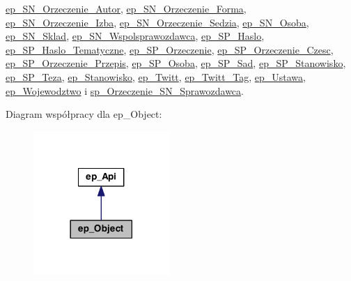 \hyperlink{classep___s_n___orzeczenie___autor}{ep\-\_\-\-S\-N\-\_\-\-Orzeczenie\-\_\-\-Autor}, \hyperlink{classep___s_n___orzeczenie___forma}{ep\-\_\-\-S\-N\-\_\-\-Orzeczenie\-\_\-\-Forma}, \hyperlink{classep___s_n___orzeczenie___izba}{ep\-\_\-\-S\-N\-\_\-\-Orzeczenie\-\_\-\-Izba}, \hyperlink{classep___s_n___orzeczenie___sedzia}{ep\-\_\-\-S\-N\-\_\-\-Orzeczenie\-\_\-\-Sedzia}, \hyperlink{classep___s_n___osoba}{ep\-\_\-\-S\-N\-\_\-\-Osoba}, \hyperlink{classep___s_n___sklad}{ep\-\_\-\-S\-N\-\_\-\-Sklad}, \hyperlink{classep___s_n___wspolsprawozdawca}{ep\-\_\-\-S\-N\-\_\-\-Wspolsprawozdawca}, \hyperlink{classep___s_p___haslo}{ep\-\_\-\-S\-P\-\_\-\-Haslo}, \hyperlink{classep___s_p___haslo___tematyczne}{ep\-\_\-\-S\-P\-\_\-\-Haslo\-\_\-\-Tematyczne}, \hyperlink{classep___s_p___orzeczenie}{ep\-\_\-\-S\-P\-\_\-\-Orzeczenie}, \hyperlink{classep___s_p___orzeczenie___czesc}{ep\-\_\-\-S\-P\-\_\-\-Orzeczenie\-\_\-\-Czesc}, \hyperlink{classep___s_p___orzeczenie___przepis}{ep\-\_\-\-S\-P\-\_\-\-Orzeczenie\-\_\-\-Przepis}, \hyperlink{classep___s_p___osoba}{ep\-\_\-\-S\-P\-\_\-\-Osoba}, \hyperlink{classep___s_p___sad}{ep\-\_\-\-S\-P\-\_\-\-Sad}, \hyperlink{classep___s_p___stanowisko}{ep\-\_\-\-S\-P\-\_\-\-Stanowisko}, \hyperlink{classep___s_p___teza}{ep\-\_\-\-S\-P\-\_\-\-Teza}, \hyperlink{classep___stanowisko}{ep\-\_\-\-Stanowisko}, \hyperlink{classep___twitt}{ep\-\_\-\-Twitt}, \hyperlink{classep___twitt___tag}{ep\-\_\-\-Twitt\-\_\-\-Tag}, \hyperlink{classep___ustawa}{ep\-\_\-\-Ustawa}, \hyperlink{classep___wojewodztwo}{ep\-\_\-\-Wojewodztwo} i \hyperlink{classsp___orzeczenie___s_n___sprawozdawca}{sp\-\_\-\-Orzeczenie\-\_\-\-S\-N\-\_\-\-Sprawozdawca}.



Diagram współpracy dla ep\-\_\-\-Object\-:\nopagebreak
\begin{figure}[H]
\begin{center}
\leavevmode
\includegraphics[width=146pt]{classep___object__coll__graph}
\end{center}
\end{figure}
